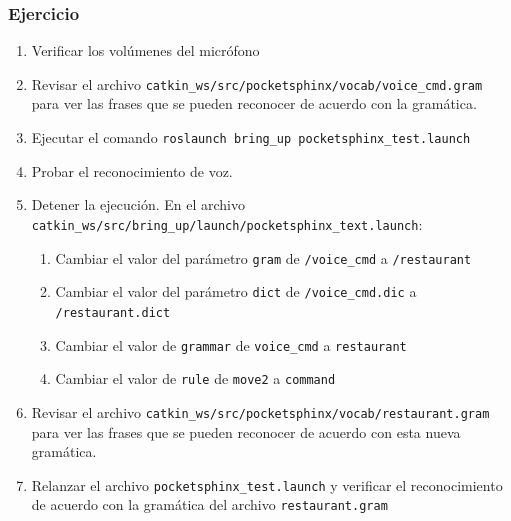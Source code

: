 \documentclass[10pt,spanish,aspectratio=1610]{beamer}
\begin{document}
\begin{frame}\frametitle{Ejercicio}
  \begin{enumerate}
  \item Verificar los volúmenes del micrófono
  \item Revisar el archivo \texttt{catkin\_ws/src/pocketsphinx/vocab/voice\_cmd.gram} para ver las frases que se pueden reconocer de acuerdo con la gramática.
  \item Ejecutar el comando \texttt{roslaunch bring\_up pocketsphinx\_test.launch}
  \item Probar el reconocimiento de voz.
  \item Detener la ejecución. En el archivo \texttt{catkin\_ws/src/bring\_up/launch/pocketsphinx\_text.launch}:
    \begin{enumerate}
    \item Cambiar el valor del parámetro \texttt{gram} de \texttt{/voice\_cmd} a \texttt{/restaurant}
    \item Cambiar el valor del parámetro \texttt{dict} de \texttt{/voice\_cmd.dic} a \texttt{/restaurant.dict}
    \item Cambiar el valor de \texttt{grammar} de \texttt{voice\_cmd} a \texttt{restaurant}
    \item Cambiar el valor de \texttt{rule} de \texttt{move2} a \texttt{command}
    \end{enumerate}
    \item Revisar el archivo \texttt{catkin\_ws/src/pocketsphinx/vocab/restaurant.gram} para ver las frases que se pueden reconocer de acuerdo con esta nueva gramática.
  \item Relanzar el archivo \texttt{pocketsphinx\_test.launch} y verificar el reconocimiento de acuerdo con la gramática del archivo \texttt{restaurant.gram}
  \end{enumerate}
\end{frame}

\end{document}
